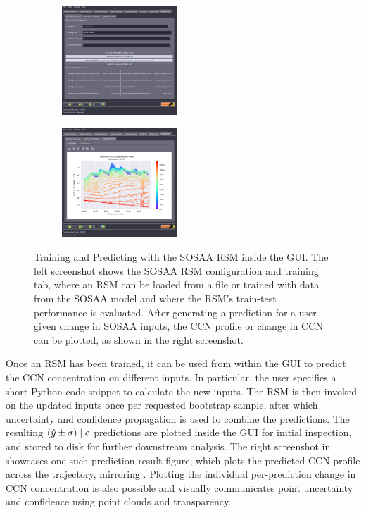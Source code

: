 \begin{figure}[H]
    \centering
    \begin{subfigure}
        \centering
        \includegraphics[width=0.475\textwidth]{sosaa-gui/figures/sosaa-rsm-train.png}
    \end{subfigure}
    \begin{subfigure}
        \centering
        \includegraphics[width=0.475\textwidth]{sosaa-gui/figures/sosaa-rsm-ccn.png}
    \end{subfigure}

    \caption[Training and Predicting with the SOSAA RSM inside the GUI]{Training and Predicting with the SOSAA RSM inside the GUI. The left screenshot shows the SOSAA RSM configuration and training tab, where an RSM can be loaded from a file or trained with data from the SOSAA model and where the RSM's train-test performance is evaluated. After generating a prediction for a user-given change in SOSAA inputs, the CCN profile or change in CCN can be plotted, as shown in the right screenshot.}
    \label{fig:sosaa-gui-rsm-train-results}
\end{figure}

\noindent Once an RSM has been trained, it can be used from within the GUI to predict the CCN concentration on different inputs. In particular, the user specifies a short Python code snippet to calculate the new inputs. The RSM is then invoked on the updated inputs once per requested bootstrap sample, after which uncertainty and confidence propagation is used to combine the predictions. The resulting $(\hat{y} \pm \sigma) \mathrel{|} c$ predictions are plotted inside the GUI for initial inspection, and stored to disk for further downstream analysis. The right screenshot in  showcases one such prediction result figure, which plots the predicted CCN profile across the trajectory, mirroring . Plotting the individual per-prediction change in CCN concentration is also possible and visually communicates point uncertainty and confidence using point clouds and transparency.


